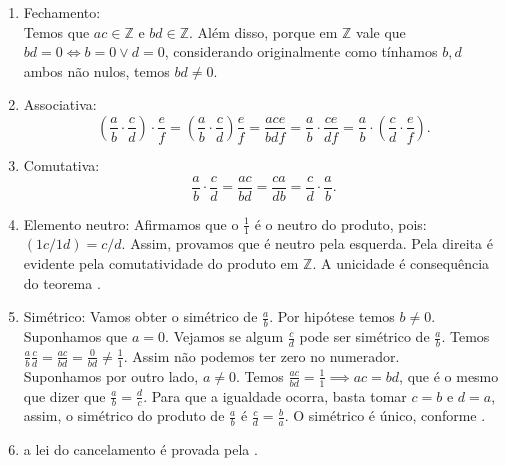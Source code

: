 \documentclass[../main.tex]{subfiles}
\begin{document}
\begin{dem}
    \begin{enumerate}[label=(\roman*)]
        \item Fechamento: \\
        Temos que $ac \in \mathbb{Z}$ e $bd \in \mathbb{Z}$. Além disso, porque em $\mathbb{Z}$ vale que \\ 
        $bd = 0 \iff b = 0 \lor d = 0$, considerando originalmente como tínhamos $b,d$ ambos não nulos, temos $bd \neq 0$.
        
        \item Associativa: \\
            \[
            \left( \frac{a}{b} \cdot \frac{c}{d}\right) \cdot \frac{e}{f} = 
            \left(\frac{a}{b} \cdot \frac{c}{d}\right) \frac{e}{f} = 
            \frac{ace}{bdf} = \frac{a}{b} \cdot \frac{ce}{df} = 
            \frac{a}{b} \cdot \left(\frac{c}{d} \cdot \frac{e}{f}\right)
            .
            \]
        
        \item Comutativa: \\
        \[ \frac{a}{b} \cdot \frac{c}{d} = 
            \frac{ac}{bd} = 
            \frac{ca}{db} = 
            \frac{c}{d} \cdot \frac{a}{b} . \]
            
        
        \item Elemento neutro: Afirmamos que o $\frac{1}{1}$ é o neutro do produto, pois: $\left(1c/1d \right) = c/d$.
        Assim, provamos que é neutro pela esquerda. Pela direita é evidente pela comutatividade do produto em $\mathbb{Z}$. A unicidade é consequência do teorema .
        
        \item Simétrico: Vamos obter o simétrico de $\frac{a}{b}$. Por hipótese temos $b \neq 0$. Suponhamos que $a=0$. Vejamos se algum $\frac{c}{d}$
        pode ser simétrico de $\frac{a}{b}$. Temos $\frac{a}{b} \frac{c}{d} = \frac{ac}{bd} = \frac{0}{bd} \neq \frac{1}{1}$. Assim não podemos ter zero no numerador. \\
        Suponhamos por outro lado, $a \neq 0$. Temos $\frac{ac}{bd} = \frac{1}{1} \implies ac = bd$, que é o mesmo que dizer que $\frac{a}{b} = \frac{d}{c}$. Para que a igualdade ocorra, basta tomar $c=b$ e $d=a$, assim, o simétrico do produto de $\frac{a}{b}$ é $\frac{c}{d} = \frac{b}{a}$. O simétrico é único, conforme .
        
        \item a lei do cancelamento é provada pela .

    \end{enumerate}    
\end{dem}
\end{document}
